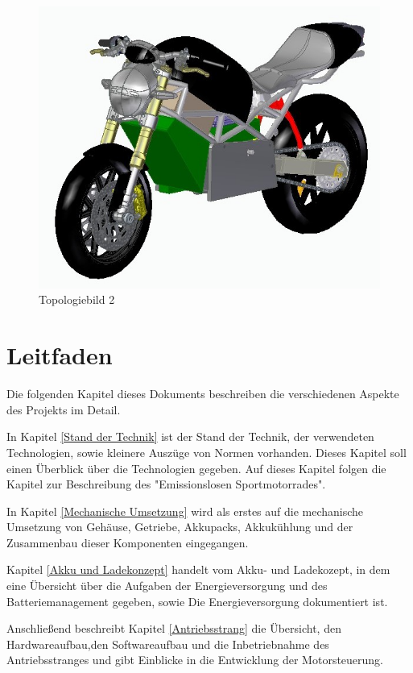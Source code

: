 \begin{figure} [H]
	\begin{center}
		\includegraphics[scale=0.9] {figures/mechanik/Ducati2.jpg}
		\caption{Topologiebild 2}
		\label{fig:Topologiebild 2}
	\end{center}
\end{figure}

\newpage
\section{Leitfaden}

Die folgenden Kapitel dieses Dokuments beschreiben die verschiedenen Aspekte des Projekts im Detail. 

In Kapitel \ref{Stand der Technik} ist der Stand der Technik, der verwendeten Technologien, sowie kleinere Auszüge von Normen vorhanden. Dieses Kapitel soll einen Überblick über die Technologien gegeben. Auf dieses Kapitel folgen die Kapitel zur Beschreibung des "Emissionslosen Sportmotorrades". 

In Kapitel \ref{Mechanische Umsetzung} wird als erstes auf die mechanische Umsetzung von Gehäuse, Getriebe, Akkupacks, Akkukühlung und der Zusammenbau dieser Komponenten eingegangen. 

Kapitel \ref{Akku und Ladekonzept} handelt vom Akku- und Ladekozept, in dem eine Übersicht über die Aufgaben der Energieversorgung und des Batteriemanagement gegeben, sowie Die Energieversorgung dokumentiert ist. 

Anschließend beschreibt Kapitel \ref{Antriebsstrang} die Übersicht, den Hardwareaufbau,den Softwareaufbau und die Inbetriebnahme des Antriebsstranges und gibt Einblicke in die Entwicklung der Motorsteuerung. 

